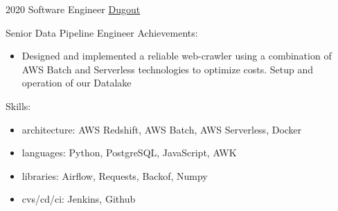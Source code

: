 \documentclass[11pt,a4paper]{moderncv}
\begin{document}

    \cventry
        {2020}
        {Software Engineer}
        {\href{https://www.dugout.com}{Dugout}} {} {}
        {
            Senior Data Pipeline Engineer
            Achievements:
            \begin{itemize}
                \item Designed and implemented a reliable web-crawler
                      using a combination of AWS Batch and Serverless
                      technologies to optimize costs.
                      Setup and operation of our Datalake
            \end{itemize}
            Skills:
            \begin{itemize}
                \item architecture: AWS Redshift, AWS Batch, AWS Serverless, Docker
                \item languages: Python, PostgreSQL, JavaScript, AWK
                \item libraries: Airflow, Requests, Backof, Numpy
                \item cvs/cd/ci: Jenkins, Github
            \end{itemize}
        }
\end{document}
